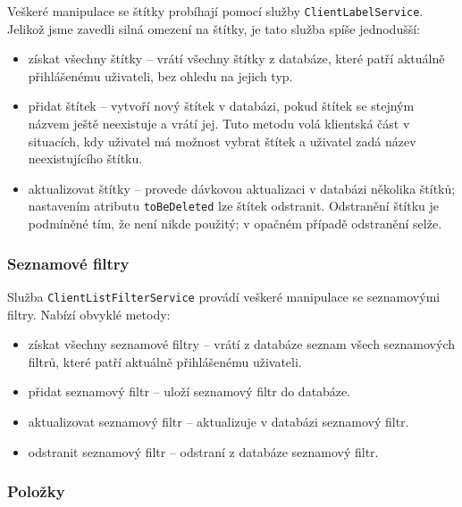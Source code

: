 Veškeré manipulace se štítky probíhají pomocí služby \verb|ClientLabelService|.
Jelikož jsme zavedli silná omezení na štítky, je tato služba spíše jednodušší:
\begin{itemize}
	\item získat všechny štítky -- vrátí všechny štítky z databáze, které patří aktuálně přihlášenému uživateli, bez ohledu na jejich typ.
	\item přidat štítek -- vytvoří nový štítek v databázi, pokud štítek se stejným názvem ještě neexistuje a vrátí jej.
		Tuto metodu volá klientská část v situacích, kdy uživatel má možnost vybrat štítek a uživatel zadá název neexistujícího štítku.
	\item aktualizovat štítky -- provede dávkovou aktualizaci v databázi několika štítků; nastavením atributu \verb|toBeDeleted| lze štítek odstranit.
		Odstranění štítku je podmíněné tím, že není nikde použitý; v opačném případě odstranění selže.
\end{itemize}

\subsubsection{Seznamové filtry}

Služba \verb|ClientListFilterService| provádí veškeré manipulace se seznamovými filtry.
Nabízí obvyklé metody:
\begin{itemize}
	\item získat všechny seznamové filtry -- vrátí z databáze seznam všech seznamových filtrů, které patří aktuálně přihlášenému uživateli.
	\item přidat seznamový filtr -- uloží seznamový filtr do databáze.
	\item aktualizovat seznamový filtr -- aktualizuje v databázi seznamový filtr.
	\item odstranit seznamový filtr -- odstraní z databáze seznamový filtr.
\end{itemize}

\subsubsection{Položky}

